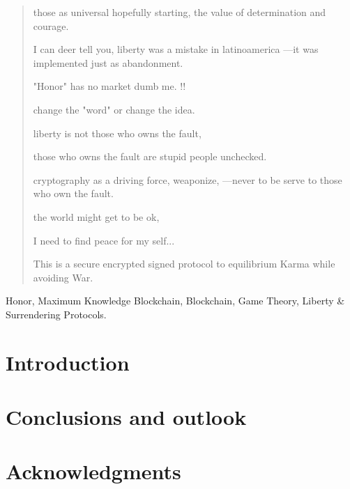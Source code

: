 \documentclass[a4paper,fleqn]{cas-sc}
\begin{document}
\begin{abstract}
  those as universal hopefully starting, the value of determination and courage. 

  I can deer tell you, liberty was a mistake in latinoamerica ---it was implemented just as abandonment. 

  "Honor" has no market dumb me. !!

  change the "word" or change the idea.

  liberty is not those who owns the fault, 

  those who owns the fault are stupid people unchecked. 

  cryptography as a driving force, weaponize, 
  ---never to be serve to those who own the fault. 

  the world might get to be ok, 

  I need to find peace for my self...

  This is a secure encrypted signed protocol 
  to equilibrium Karma while avoiding War. 
  
\end{abstract}
 \begin{keywords}
  Honor, Maximum Knowledge Blockchain, Blockchain, Game Theory, Liberty \& Surrendering Protocols. 
 \end{keywords}

 \maketitle

\section{Introduction}

\section{}
\section{}
\section{}

\section{Conclusions and outlook}

\section{Acknowledgments}



\end{document}

